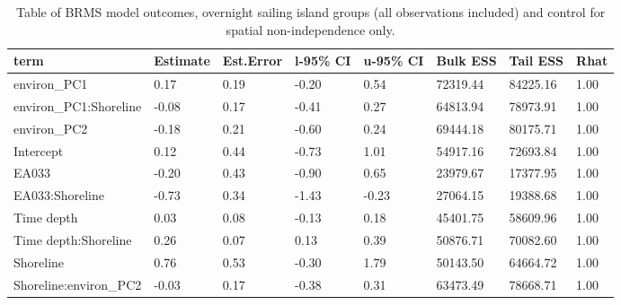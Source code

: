 \begin{table}[ht]
\centering
\begin{tabular}{p{3cm}p{1.35cm}p{1.35cm}p{1.35cm}p{1.35cm}p{1.35cm}p{1.35cm}p{1.35cm}}
  \toprule
term & Estimate & Est.Error & l-95\% CI & u-95\% CI & Bulk ESS & Tail ESS & Rhat \\ 
  \midrule
environ\_PC1 & 0.17 & 0.19 & -0.20 & 0.54 & 72319.44 & 84225.16 & 1.00 \\ 
  environ\_PC1:Shoreline & -0.08 & 0.17 & -0.41 & 0.27 & 64813.94 & 78973.91 & 1.00 \\ 
  environ\_PC2 & -0.18 & 0.21 & -0.60 & 0.24 & 69444.18 & 80175.71 & 1.00 \\ 
  Intercept & 0.12 & 0.44 & -0.73 & 1.01 & 54917.16 & 72693.84 & 1.00 \\ 
  EA033 & -0.20 & 0.43 & -0.90 & 0.65 & 23979.67 & 17377.95 & 1.00 \\ 
  EA033:Shoreline & -0.73 & 0.34 & -1.43 & -0.23 & 27064.15 & 19388.68 & 1.00 \\ 
  Time depth & 0.03 & 0.08 & -0.13 & 0.18 & 45401.75 & 58609.96 & 1.00 \\ 
  Time depth:Shoreline & 0.26 & 0.07 & 0.13 & 0.39 & 50876.71 & 70082.60 & 1.00 \\ 
  Shoreline & 0.76 & 0.53 & -0.30 & 1.79 & 50143.50 & 64664.72 & 1.00 \\ 
  Shoreline:environ\_PC2 & -0.03 & 0.17 & -0.38 & 0.31 & 63473.49 & 78668.71 & 1.00 \\ 
   \bottomrule
\end{tabular}
\caption{Table of BRMS model outcomes, overnight sailing island groups (all observations included) and control for spatial non-independence only.} 
\label{BRMS_effects_SBZR_control_spatial}
\end{table}
